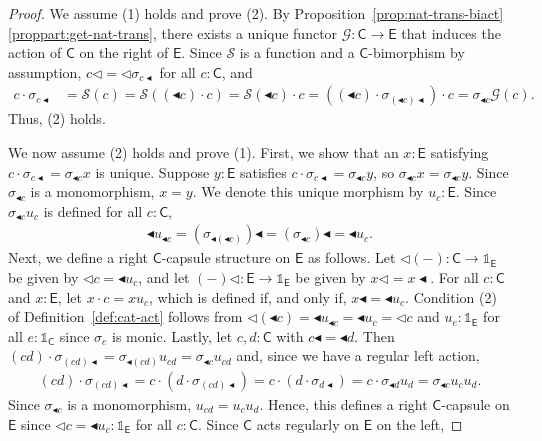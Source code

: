 \documentclass{amsart}
\newcommand{\Cat}[1]{\mathsf{#1}}
\newcommand{\cat}[1]{\Cat{#1}}
\newcommand{\acat}[1]{\mathsf{#1}}
\numberwithin{lstfloat}{section}
\newcommand{\srcfunc}{\mathbin{\blacktriangleleft}}
\newcommand{\tgtfunc}{\mathbin{\blacktriangleleft}}
\newcommand{\src}[1]{#1\srcfunc}
\newcommand{\tgt}[1]{\tgtfunc #1}
\newcommand{\one}{\mathbb{1}}
\newcommand{\func}[1]{\mathcal{#1}}
\newcommand{\fG}{\func{G}}
\newcommand{\fS}{\func{S}}
\newcommand{\cC}{\cat{C}}
\newcommand{\cE}{\cat{E}}
\theoremstyle{definition}
\theoremstyle{remark}
\numberwithin{equation}{section}
\begin{document}
\begin{proof}
  We assume (1) holds and prove (2). By
  Proposition~\ref{prop:nat-trans-biact}\ref{proppart:get-nat-trans}, there exists a unique
  functor $\func{G} : \acat{C}\to \acat{E}$ that induces the action of
  $\acat{C}$ on the right of $\acat{E}$. Since $\fS$ is a function and a 
  $\cC$-bimorphism by assumption, $c\lhd= \lhd \sigma_{\src{c}}$ for all
  $c:\acat{C}$, and 
  \begin{align*}
    c\cdot \sigma_{\src{c}} 
    & = \fS(c) =\fS((\tgt c)\cdot c)= \fS(\tgt{c})\cdot c
    = ((\tgt{c}) \cdot \sigma_{\src{(\tgt{c})}}) \cdot c  
    =\sigma_{\tgt{c}}\fG(c) . 
  \end{align*}
  Thus, (2) holds.

  We now assume (2) holds and prove (1). First, we show that an $x:\acat{E}$
  satisfying $c\cdot \sigma_{\src{c}} = \sigma_{\tgt{c}}x$ is unique. Suppose
  $y:\acat{E}$ satisfies $c\cdot \sigma_{\src{c}} = \sigma_{\tgt{c}}y$, so
  $\sigma_{\tgt{c}}x = \sigma_{\tgt{c}}y$. Since $\sigma_{\tgt{c}}$ is a
  monomorphism, $x=y$. We denote this unique morphism by $u_c:\acat{E}$. Since
  $\sigma_{\tgt{c}}u_c$ is defined for all $c:\cC$, 
  \begin{align*}
    \tgt{u_{\tgt{c}}} = \src{(\sigma_{\tgt{(\tgt{c})}})} 
    = \src{(\sigma_{\tgt{c}})} = \tgt{u_c}.
  \end{align*}
  Next, we define a right $\cC$-capsule structure on $\acat{E}$ as
  follows. Let $\lhd (-) : \cC \to \one_{\cE}$ be given by $\lhd c =
  \tgt{u_c}$, and let $(-)\lhd : \cE \to \one_{\cE}$ be given by
  $x\lhd = \src{x}$. For all $c:\cC$ and $x:\cE$, let $x\cdot c =
  xu_c$, which is defined if, and only if, $\src{x} = \tgt{u_c}$. Condition (2)
  of Definition~\ref{def:cat-act} follows from $\lhd (\tgt{c}) = \tgt{u_{\tgt{c}}} =
  \tgt{u_c} = \lhd c$ and $u_e:\one_{\cE}$ for all $e:\one_{\cC}$
  since $\sigma_e$ is monic. Lastly, let $c,d:\cC$ with $\src{c}=\tgt{d}$.
  Then $(cd) \cdot \sigma_{\src{(cd)}} = \sigma_{\tgt{(cd)}}u_{cd} =
  \sigma_{\tgt{c}}u_{cd}$ and, since we have a regular left action,  
  \begin{align*}
    (cd) \cdot \sigma_{\src{(cd)}}  
    = c \cdot (d \cdot \sigma_{\src{(cd)}})
    = c\cdot (d\cdot \sigma_{\src{d}}) 
    = c\cdot \sigma_{\tgt{d}} u_d 
    = \sigma_{\tgt{c}}u_cu_d.
  \end{align*}
  Since $\sigma_{\tgt{c}}$ is a monomorphism, $u_{cd}=u_cu_d$. Hence, this
  defines a right $\cC$-capsule on $\cE$ since $\lhd c = \tgt{u_c}:\one_{\cE}$
  for all $c:\cC$. Since $\acat{C}$ acts regularly on $\acat{E}$ on the left,

\end{proof}
\end{document}
